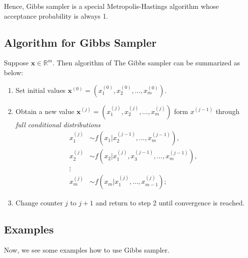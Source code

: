 Hence, Gibbs sampler is a special Metropolis-Hastings algorithm whose acceptance probability is always 1.

\subsection{Algorithm for Gibbs Sampler}
Suppose $ \mathbf{x}\in \mathds{R}^m $. Then algorithm of The Gibbs sampler can be summarized as below:
\begin{enumerate}
    \item Set initial values $ \mathbf{x}^{(0)} = ( x_1^{(0)}, x_2^{(0)} , \ldots , x_m^{(0)}  ) $.
    \item Obtain a new value $ \mathbf{x}^{(j)} = ( x_1^{(j)}, x_2^{(j)}, \ldots , x_m^{(j)} )$ form $ x^{(j-1)} $ through \textit{full conditional distributions}
            \begin{align*}
                x_1^{(j)} &\sim f(x_1|x_2^{(j-1)}, \ldots, x_m^{(j-1)}  ),\\
                x_2^{(j)} &\sim f(x_2|x_1^{(j)}, x_3^{(j-1)}, \ldots, x_m^{(j-1)}), \\
                \vdots \\
                x_m^{(j)} &\sim f(x_m|x_1^{(j)}, \ldots , x_{m-1}^{(j)}  );
            \end{align*}
            \item Change counter $ j $ to $ j + 1 $ and return to step 2 until convergence is reached. 
\end{enumerate}

\subsection{Examples}
Now, we see some examples how to use Gibbs sampler.

